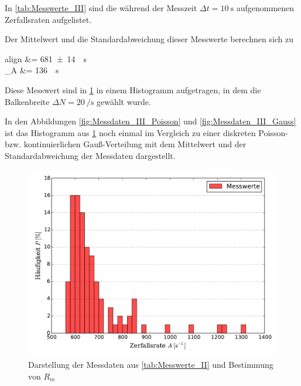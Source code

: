 	In \cref{tab:Messwerte_III} sind die  während der Messzeit 
	$\Delta t = \SI{10}{\second}$ aufgenommenen Zerfallsraten aufgelistet.
	
	Der Mittelwert und die Standardabweichung dieser Messwerte berechnen sich zu
	\begin{empheq}{align}
		 &= \SI{681(14)}{\per\second}\\
		\sigma_{A} &= \SI{136}{\per\second}\\
	\end{empheq}
	
	Diese Messwert sind in \cref{fig:Messdaten_III} in einem Histogramm aufgetragen,
	in dem die Balkenbreite $\Delta N = \SI{20}{\per\second}$ gewählt wurde.
	
	In den Abbildungen \ref{fig:Messdaten_III_Poisson} und \ref{fig:Messdaten_III_Gauss}
	ist das Histogramm aus \cref{fig:Messdaten_III} noch einmal im Vergleich zu einer 
	diskreten Poisson- bzw. kontinuierlichen Gauß-Verteilung mit dem Mittelwert und der 
	Standardabweichung der Messdaten dargestellt.
	
	
	\begin{figure}[!h]
		\centering
		\includegraphics[scale=0.7]{Grafiken/AktivitaetHistogramm.pdf}
		\caption{Darstellung der Messdaten aus \cref{tab:Messwerte_II} und Bestimmung von $R_{m}$}
		\label{fig:Messdaten_III}
	\end{figure}
		
